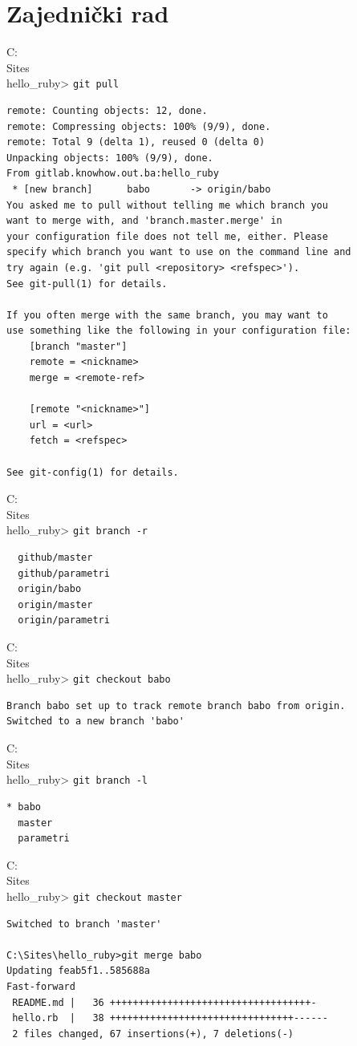\documentclass[times, utf8, seminar]{fit}
\begin{document}
\section{Zajednički rad}


C:\\Sites\\hello\_ruby> \texttt{git pull}
\begin{lstlisting}
remote: Counting objects: 12, done.
remote: Compressing objects: 100% (9/9), done.
remote: Total 9 (delta 1), reused 0 (delta 0)
Unpacking objects: 100% (9/9), done.
From gitlab.knowhow.out.ba:hello_ruby
 * [new branch]      babo       -> origin/babo
You asked me to pull without telling me which branch you
want to merge with, and 'branch.master.merge' in
your configuration file does not tell me, either. Please
specify which branch you want to use on the command line and
try again (e.g. 'git pull <repository> <refspec>').
See git-pull(1) for details.

If you often merge with the same branch, you may want to
use something like the following in your configuration file:
    [branch "master"]
    remote = <nickname>
    merge = <remote-ref>

    [remote "<nickname>"]
    url = <url>
    fetch = <refspec>

See git-config(1) for details.
\end{lstlisting}

C:\\Sites\\hello\_ruby> \texttt{git branch -r}
\begin{lstlisting}
  github/master
  github/parametri
  origin/babo
  origin/master
  origin/parametri
\end{lstlisting}

C:\\Sites\\hello\_ruby> \texttt{git checkout babo}
\begin{lstlisting}
Branch babo set up to track remote branch babo from origin.
Switched to a new branch 'babo'
\end{lstlisting}

C:\\Sites\\hello\_ruby> \texttt{git branch -l}
\begin{lstlisting}
* babo
  master
  parametri
\end{lstlisting}

C:\\Sites\\hello\_ruby> \texttt{git checkout master}
\begin{lstlisting}
Switched to branch 'master'

C:\Sites\hello_ruby>git merge babo
Updating feab5f1..585688a
Fast-forward
 README.md |   36 +++++++++++++++++++++++++++++++++++-
 hello.rb  |   38 ++++++++++++++++++++++++++++++++------
 2 files changed, 67 insertions(+), 7 deletions(-)
\end{lstlisting}
\end{document}
